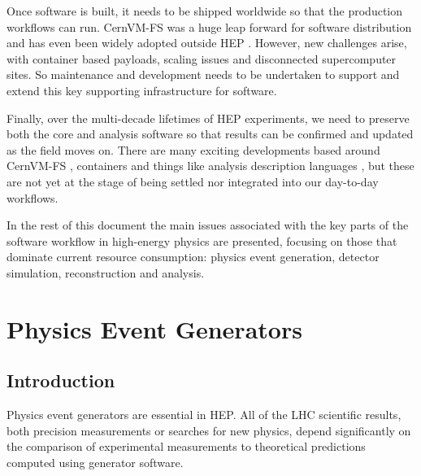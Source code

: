 \documentclass[11pt,a4paper]{article}
\begin{document}
Once software is built, it needs to be shipped worldwide so that the
production workflows can run. CernVM-FS was a huge leap forward for
software distribution and has even been widely adopted outside HEP 
\cite{Blomer_2011, 7310920}.
However, new challenges arise, with container based payloads, scaling
issues and disconnected supercomputer sites. So maintenance and
development needs to be undertaken to support and extend this key
supporting infrastructure for software.

Finally, over the multi-decade lifetimes of HEP experiments, we need to
preserve both the core and analysis software so that results can be
confirmed and updated as the field moves on. There are many exciting
developments based around CernVM-FS
\cite{10.1007/978-3-319-67630-2_52, serverless-cvmfs}, containers and things like analysis
description languages \cite{Ref10}, but these are not yet at the stage of being
settled nor integrated into our day-to-day workflows.

In the rest of this document the main issues associated with the key
parts of the software workflow in high-energy physics are presented,
focusing on those that dominate current resource consumption: physics
event generation, detector simulation, reconstruction and analysis.

\hypertarget{physics-event-generators}{%
\section{Physics Event Generators}\label{physics-event-generators}}

\hypertarget{introduction-1}{%
\subsection{Introduction}\label{introduction-1}}

Physics event generators are essential in HEP. All of the LHC scientific
results, both precision measurements or searches for new physics, depend
significantly on the comparison of experimental measurements to
theoretical predictions computed using generator software.
\end{document}
